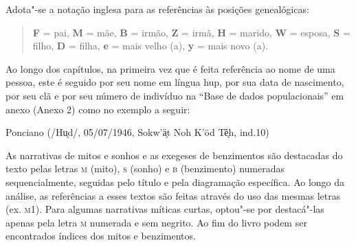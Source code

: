 \bigskip

Adota"-se a notação inglesa para as referências às posições genealógicas:

\begin{quote}
\textbf{F} = pai, \textbf{M} = mãe, \textbf{B} = irmão, \textbf{Z} =
irmã, \textbf{H} = marido, \textbf{W} = esposa, \textbf{S} = filho,
\textbf{D} = filha, \textbf{e} = mais velho (a), \textbf{y} = mais novo
(a).
\end{quote}

\medskip

Ao longo dos capítulos, na primeira vez que é feita referência ao nome de
uma pessoa, este é seguido por seu nome em língua hup, por sua data de
nascimento, por seu clã e por seu número de indivíduo na ``Base de dados
populacionais'' em anexo (Anexo 2) como no exemplo a seguir:

Ponciano (/Hu̖d/, 05/07/1946, Sokw'ä̗t Noh K'öd Tẽ̖h, ind.10)

As narrativas de mitos e sonhos e as exegeses de benzimentos são
destacadas do texto pelas letras \textsc{m} (mito), \textsc{s} (sonho) e
\textsc{b} (benzimento) numeradas sequencialmente, seguidas
pelo título e pela diagramação específica. Ao longo da análise, as
referências a esses textos são feitas através do uso das mesmas letras
(ex. \textsc{m1}). Para algumas narrativas míticas curtas, optou"-se
por destacá"-las apenas pela letra \textsc{m} numerada e sem negrito. Ao fim do
livro podem ser encontrados índices dos mitos e benzimentos.